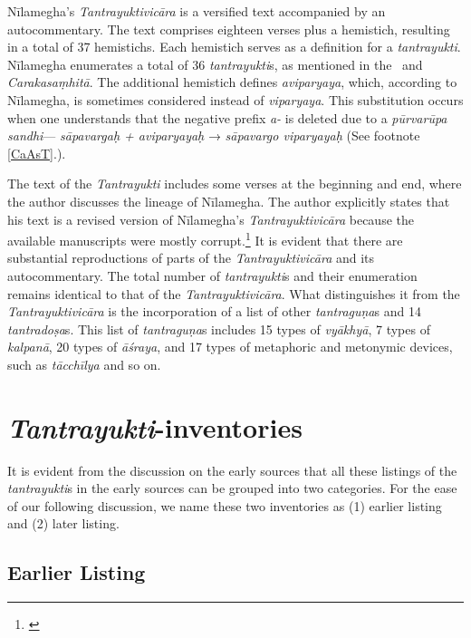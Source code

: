 Nīlamegha's \emph{Tantrayuktivicāra} is a versified text accompanied by an autocommentary. The text comprises eighteen verses plus a hemistich, resulting in a total of 37 hemistichs. Each hemistich serves as a definition for a \emph{tantrayukti}. Nīlamegha enumerates a total of 36 \emph{tantrayukti}s, as mentioned in the \AS\ and \emph{Carakasaṃhitā}. The additional hemistich defines \emph{aviparyaya}, which, according to Nīlamegha, is sometimes considered instead of \emph{viparyaya}. This substitution occurs when one understands that the negative prefix \emph{a-} is deleted due to a \emph{pūrvarūpa sandhi}--- \emph{sāpavargaḥ + aviparyayaḥ} → \emph{sāpavargo viparyayaḥ} (See footnote \ref{CaAsT}.).

The text of the \emph{Tantrayukti} includes some verses at the beginning and end, where the author discusses the lineage of Nīlamegha. The author explicitly states that his text is a revised version of Nīlamegha's \emph{Tantrayuktivicāra} because the available manuscripts were mostly corrupt.\footnote{
	\cite[1]{nara-1949}} 
It is evident that there are substantial reproductions of parts of the \emph{Tantrayuktivicāra} and its autocommentary. The total number of \emph{tantrayukti}s and their enumeration remains identical to that of the \emph{Tantrayuktivicāra}. What distinguishes it from the \emph{Tantrayuktivicāra} is the incorporation of a list of other \emph{tantraguṇa}s and 14 \emph{tantradoṣa}s. This list of \emph{tantraguṇa}s includes 15 types of \emph{vyākhyā}, 7 types of \emph{kalpanā}, 20 types of \emph{āśraya}, and 17 types of metaphoric and metonymic devices, such as \emph{tācchīlya} and so on.

\section{\emph{Tantrayukti}-inventories}

It is evident from the discussion on the early sources that all these listings of the \emph{tantrayukti}s in the early sources can be grouped into two categories. For the ease of our following discussion, we name these two inventories as (1) earlier listing and (2) later listing.

\subsection{Earlier Listing}

